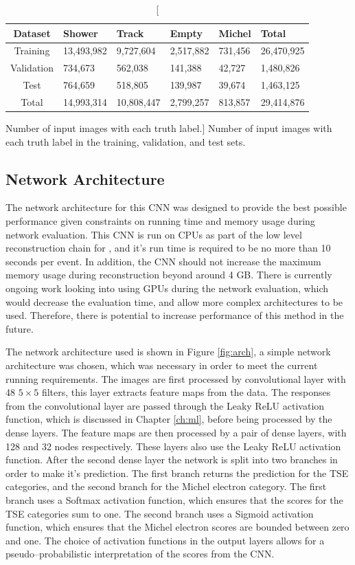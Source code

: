 \begin{table}
	\centering
	\bgroup
	\def\arraystretch{1.5}
	\begin{tabularx}{\textwidth}{@{}c|Y|Y|Y|Y|Y@{}}
		Dataset    & Shower     & Track      & Empty     & Michel  & Total      \\ \hline
		Training   & 13,493,982 & 9,727,604  & 2,517,882 & 731,456 & 26,470,925 \\
		Validation & 734,673    & 562,038    & 141,388   & 42,727  & 1,480,826  \\
		Test       & 764,659    & 518,805    & 139,987   & 39,674  & 1,463,125  \\ \hline
		Total      & 14,993,314 & 10,808,447 & 2,799,257 & 813,857 & 29,414,876
	\end{tabularx}
	\egroup
	\caption
	[Number of input images with each truth label.]
	{Number of input images with each truth label in the training, validation, and
	test sets.}
	\label{tab:patches}
\end{table}

\subsection{Network Architecture}

The network architecture for this CNN was designed to provide the best possible
performance given constraints on running time and memory usage during network
evaluation. This CNN is run on CPUs as part of the low level reconstruction 
chain for \protodune{}, and it's run time is required to be no more than 10 
seconds per event. In addition, the CNN should not increase the maximum memory 
usage during reconstruction beyond around 4 GB. There is currently ongoing 
work looking into using GPUs during the network evaluation, which would decrease
the evaluation time, and allow more complex architectures to be used. 
Therefore, there is potential to increase performance of this method in the 
future.

The network architecture used is shown in Figure \ref{fig:arch}, a simple
network architecture was chosen, which was necessary in order to meet the 
current running requirements. The images are first processed by convolutional 
layer with 48 $5 \times 5$ filters, this layer extracts feature maps from the 
data. The responses from the convolutional layer are passed through the Leaky 
ReLU activation function, which is discussed in Chapter \ref{ch:ml}, before 
being processed by the dense layers. The feature maps are then processed by a 
pair of dense layers, with 128 and 32 nodes respectively. These layers also 
use the Leaky ReLU activation function. After the second dense layer the 
network is split into two branches in order to make it's prediction. The first 
branch returns the prediction for the TSE categories, and the second branch 
for the Michel electron category. The first branch uses a Softmax activation 
function, which ensures that the scores for the TSE categories sum to one.  
The second branch uses a Sigmoid activation function, which ensures that the 
Michel electron scores are bounded between zero and one. The choice of 
activation functions in the output layers allows for a pseudo--probabilistic 
interpretation of the scores from the CNN.

